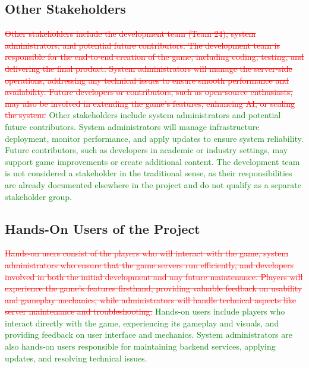 \documentclass[12pt]{article}
\newcommand{\removed}[1]{\textcolor{red}{\sout{#1}}}
\newcommand{\added}[1]{\textcolor{green}{#1}}
\begin{document}
\subsection{Other Stakeholders}
\removed{Other stakeholders include the development team (Team 24), system administrators, and potential future contributors. The development team is responsible for the end-to-end creation of the game, including coding, testing, and delivering the final product. System administrators will manage the server-side operations, addressing any technical issues to ensure smooth performance and availability. Future developers or contributors, such as open-source enthusiasts, may also be involved in extending the game’s features, enhancing AI, or scaling the system.}
\added{Other stakeholders include system administrators and potential future contributors. System administrators will manage infrastructure deployment, monitor performance, and apply updates to ensure system reliability. Future contributors, such as developers in academic or industry settings, may support game improvements or create additional content. The development team is not considered a stakeholder in the traditional sense, as their responsibilities are already documented elsewhere in the project and do not qualify as a separate stakeholder group.}

\subsection{Hands-On Users of the Project}
\removed{Hands-on users consist of the players who will interact with the game, system administrators who ensure that the game servers run efficiently, and developers involved in both the initial development and any future maintenance. Players will experience the game's features firsthand, providing valuable feedback on usability and gameplay mechanics, while administrators will handle technical aspects like server maintenance and troubleshooting.}
\added{Hands-on users include players who interact directly with the game, experiencing its gameplay and visuals, and providing feedback on user interface and mechanics. System administrators are also hands-on users responsible for maintaining backend services, applying updates, and resolving technical issues.}
\end{document}
